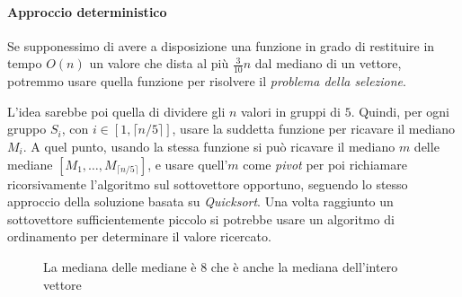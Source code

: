 
\paragraph{Approccio deterministico}
Se supponessimo di avere a disposizione una funzione in grado di restituire in
tempo $O(n)$ un valore che dista al più $\frac{3}{10}n$ dal mediano di un vettore,
potremmo usare quella funzione per risolvere il \emph{problema della selezione}.

L'idea sarebbe poi quella di dividere gli $n$ valori in gruppi di $5$. Quindi,
per ogni gruppo $S_i$, con $i\in[1,\lceil n/5\rceil]$, usare la suddetta funzione
per ricavare il mediano $M_i$. A quel punto, usando la stessa funzione si può
ricavare il mediano $m$ delle mediane $[M_1,\dots,M_{\lceil n/5\rceil}]$, e usare
quell'$m$ come \emph{pivot} per poi richiamare ricorsivamente l'algoritmo
sul sottovettore opportuno, seguendo lo stesso approccio della soluzione
basata su \emph{Quicksort}. Una volta raggiunto un sottovettore sufficientemente
piccolo si potrebbe usare un algoritmo di ordinamento per determinare il valore
ricercato.

\begin{figure}[h!]
\centering
{}
\caption{La mediana delle mediane è $8$ che è anche la mediana dell'intero vettore}
\end{figure}

